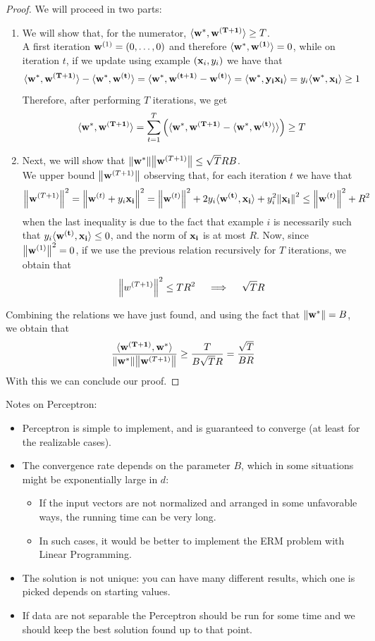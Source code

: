 \documentclass[12pt]{report}
\theoremstyle{plain}
\newcommand\sprod[2]{\langle \vb{#1},\vb{#2}\rangle}
\begin{document}
\begin{flushleft}
\begin{proof}
	We will proceed in two parts:
	\begin{enumerate}
		\item We will show that, for the numerator, $\sprod{w^*}{w^{(T+1)}}\geq 
		T$.\\
		A first iteration $\vb{w}^{(1)}=(0,\dots,0)$ and therefore 
		$\sprod{w^*}{w^{(1)}}=0$, while on iteration $t$, if we update using 
		example $(\vb{x}_i,y_i)$ we have that
		\[ 
		\sprod{w^*}{w^{(T+1)}}-\sprod{w^*}{w^{(t)}}=\sprod{w^*}{w^{(t+1)}-w^{(t)}}
		 = \sprod{w^*}{y_i\vb{x_i}} = y_i\sprod{w^*}{x_i}\geq 1 \]
		Therefore, after performing $T$ iterations, we get
		\[ \sprod{w^*}{w^{(T+1)}}=\sum_{t=1}^T 
		\left(\sprod{w^*}{w^{(T+1)}-\sprod{w^*}{w^{(t)}}}\right)\geq T \]
		\item Next, we will show that 
		$\norm{\vb{w}^*}\norm{\vb{w}^{(T+1)}}\leq\sqrt{T}RB$.\\
		We upper bound $\norm{\vb{w}^{(T+1)}}$ observing that, for each 
		iteration $t$ we have that
		\[ \norm{\vb{w}^{(T+1)}}^2=\norm{\vb{w}^{(t)}+y_i\vb{x_i}}^2 = 
		\norm{\vb{w}^{(t)}}^2+2y_i\sprod{w^{(t)}}{x_i}+y_i^2\norm{\vb{x_i}}^2 
		\leq\norm{\vb{w}^{(t)}}^2+R^2 \]
		when the last inequality is due to the fact that example $i$ is 
		necessarily such that $y_i\sprod{w^{(t)}}{x_i}\leq 0$, and the norm of 
		$\vb{x_i}$ is at most $R$. Now, since $\norm{\vb{w}^{(1)}}^2=0$, if we 
		use the previous relation recursively for $T$ iterations, we obtain that
		\[ \norm{w^{(T+1)}}^2\leq TR^2\quad\implies\quad \sqrt{T}R \]
	\end{enumerate}
	Combining the relations we have just found, and using the fact that 
	$\norm{\vb{w}^*}=B$, we obtain that
	\[ 
	\frac{\sprod{w^{(T+1)}}{w^*}}{\norm{\vb{w^*}}\norm{\vb{w}^{(T+1)}}}\geq\frac{T}{B\sqrt{T}R}=\frac{\sqrt{T}}{BR}
	 \]
	With this we can conclude our proof.
\end{proof}
Notes on Perceptron:
\begin{itemize}
	\item Perceptron is simple to implement, and is guaranteed to converge (at 
	least for the realizable cases).
	\item The convergence rate depends on the parameter $B$, which in some 
	situations might be exponentially large in $d$:
	\begin{itemize}
		\item If the input vectors are not normalized and arranged in some 
		unfavorable ways, the running time can be very long.
		\item In such cases, it would be better to implement the ERM problem 
		with Linear Programming.
	\end{itemize}
	\item The solution is not unique: you can have many different results, 
	which one is picked depends on starting values.
	\item If data are not separable the Perceptron should be run for some time 
	and we should keep the best solution found up to that point.
\end{itemize}



\end{flushleft}
\end{document}
